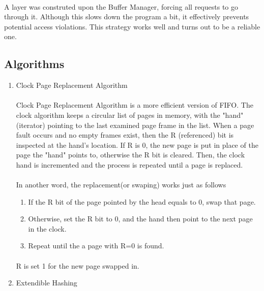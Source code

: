 \documentclass{article}
\begin{document}
        \paragraph{}
            A layer was construted upon the Buffer Manager, forcing all requests to go through it. Although this slows down the program a bit, it effectively prevents potential access violations. This strategy works well and turns out to be a reliable one.
    \subsection{Algorithms}
        \begin{enumerate}
            \item Clock Page Replacement Algorithm
                \paragraph{}
                    Clock Page Replacement Algorithm is a more efficient version of FIFO. The clock algorithm keeps a circular list of pages in memory, with the "hand" (iterator) pointing to the last examined page frame in the list. When a page fault occurs and no empty frames exist, then the R (referenced) bit is inspected at the hand's location. If R is 0, the new page is put in place of the page the "hand" points to, otherwise the R bit is cleared. Then, the clock hand is incremented and the process is repeated until a page is replaced.
                \paragraph{}
                    In another word, the replacement(or swaping) works just as follows
                    \begin{enumerate}
                        \item If the R bit of the page pointed by the head equals to 0, swap that page.
                        \item Otherwise, set the R bit to 0, and the hand then point to the next page in the clock.
                        \item Repeat until the a page with R=0 is found.
                    \end{enumerate}
                \paragraph{}
                    R is set 1 for the new page swapped in.
            \item Extendible Hashing

\end{enumerate}
\end{document}
